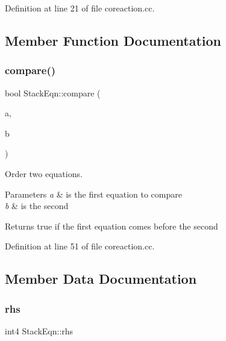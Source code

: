 Definition at line 21 of file coreaction.\+cc.



\subsection{Member Function Documentation}
\mbox{\label{struct_stack_eqn_ac0a43b31e135824bcbc459c48839c61b}} 
\subsubsection{\texorpdfstring{compare()}{compare()}}
{\footnotesize\ttfamily bool Stack\+Eqn\+::compare (\begin{DoxyParamCaption}\item[{const \mbox{\hyperlink{struct_stack_eqn}{Stack\+Eqn}} \&}]{a,  }\item[{const \mbox{\hyperlink{struct_stack_eqn}{Stack\+Eqn}} \&}]{b }\end{DoxyParamCaption})\hspace{0.3cm}{\ttfamily [static]}}



Order two equations. 


\begin{DoxyParams}{Parameters}
{\em a} & is the first equation to compare \\
\hline
{\em b} & is the second \\
\hline
\end{DoxyParams}
\begin{DoxyReturn}{Returns}
true if the first equation comes before the second 
\end{DoxyReturn}


Definition at line 51 of file coreaction.\+cc.



\subsection{Member Data Documentation}
\mbox{\label{struct_stack_eqn_a6077381330daeeed1ec22e242761d29a}} 
\subsubsection{\texorpdfstring{rhs}{rhs}}
{\footnotesize\ttfamily int4 Stack\+Eqn\+::rhs}



